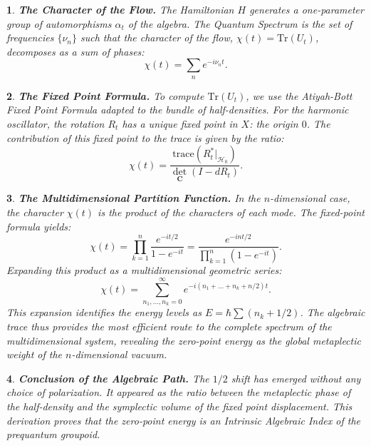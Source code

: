 \documentclass[11pt,reqno,letterpaper,twoside]{amsart}
\theoremstyle{articlestyle}
\newtheorem{article}{}
\theoremstyle{plain}
\theoremstyle{definition}
\def\artlabel[#1]{\textbf{#1.}}
\newcommand{\CC}{\mathbf{C}}
\newcommand{\0}{\hat{0}}
\newcommand{\1}{\hat{1}}
\begin{document}
  \begin{article}\artlabel[The Character of the Flow]
    The Hamiltonian $H$ generates a one-parameter group of automorphisms $\alpha_t$ of the algebra.
    The \emph{Quantum Spectrum} is the set of frequencies $\{\nu_n\}$ such that the character of the flow,
    $\chi(t) = \mathrm{Tr}(U_t)$,
    decomposes as a sum of phases:
    $$
      \chi(t) = \sum_n e^{-i \nu_n t}.
      $$
  \end{article}
  
  \begin{article}\artlabel[The Fixed Point Formula]
    To compute $\mathrm{Tr}(U_t)$,
    we use the \emph{Atiyah-Bott Fixed Point Formula} \cite{AB67, AB68} 
    adapted to the bundle of half-densities.
    For the harmonic oscillator,
    the rotation $R_t$ has a unique fixed point in $X$:
    the origin $0$.
    The contribution of this fixed point to the trace is given by the ratio:
    $$
      \chi(t) = \frac{\mathrm{trace}(R_t^* |_{\mathcal{H}_0})}{\det_{\CC}(I - dR_t)}.
      $$
  \end{article}
  
  \begin{article}\artlabel[The Multidimensional Partition Function]
    In the $n$-dimensional case,
    the character $\chi(t)$ is the product of the characters of each mode.
    The fixed-point formula yields:
    $$
      \chi(t) = \prod_{k=1}^n \frac{e^{-it/2}}{1 - e^{-it}} = \frac{e^{-int/2}}{\prod_{k=1}^n (1 - e^{-it})}.
      $$
    Expanding this product as a multidimensional geometric series:
    $$
      \chi(t) = \sum_{n_1, \dots, n_k = 0}^\infty e^{-i(n_1 + \dots + n_k + n/2)t}.
      $$
    This expansion identifies the energy levels as $E = \hbar \sum (n_k + 1/2)$.
    The algebraic trace thus provides the most efficient route
    to the complete spectrum of the multidimensional system,
    revealing the zero-point energy as the global metaplectic weight 
    of the $n$-dimensional vacuum.
  \end{article}
  
  \begin{article}\artlabel[Conclusion of the Algebraic Path]
    The $1/2$ shift has emerged without any choice of polarization.
    It appeared as the \emph{ratio between the metaplectic phase of the half-density 
    and the symplectic volume of the fixed point displacement}.
    This derivation proves that the zero-point energy is an \emph{Intrinsic Algebraic Index}
    of the prequantum groupoid.
  \end{article}
  
\end{document}
